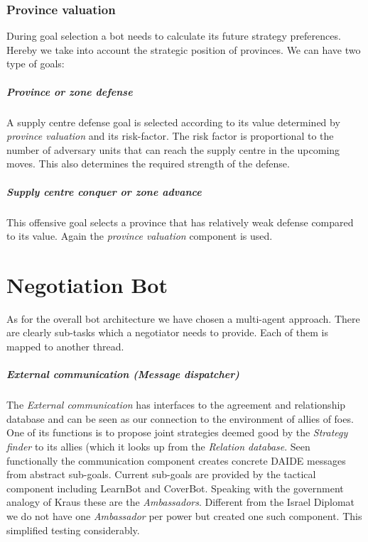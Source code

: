 \documentclass[pdftex,11pt,a4paper]{report}
\begin{document}
\subsection{Province valuation}
During goal selection a bot needs to calculate its future strategy
preferences. Hereby we take into account the strategic position of 
provinces. We can have two type of goals:

\paragraph{Province or zone defense}
A supply centre defense goal is selected according to its value
determined by \textit{province valuation} and its risk-factor. The
risk factor is proportional to the number of adversary units that 
can reach the supply centre in the upcoming moves. This also determines
the required strength of the defense.

\paragraph{Supply centre conquer or zone advance}
This offensive goal selects a province that has relatively weak 
defense compared to its value. Again the \textit{province valuation}
component is used.


\chapter{Negotiation Bot}

As for the overall bot architecture we have chosen a multi-agent 
approach. There are clearly sub-tasks which a negotiator needs to
provide. Each of them is mapped to another thread.

\paragraph{External communication (Message dispatcher)}
The \textit{External communication} has interfaces to the agreement 
and relationship database and can be seen as our connection to the
environment of allies of foes. One of its functions is to propose
joint strategies deemed good by the \textit{Strategy finder} to its
allies (which it looks up from the \textit{Relation database}. Seen
functionally the communication component creates concrete DAIDE
messages from abstract sub-goals. Current sub-goals are provided
by the tactical component including LearnBot and CoverBot. Speaking
with the government analogy of Kraus \cite{Kraus89} these are the
\textit{Ambassadors}. Different from the Israel Diplomat we do not
have one \textit{Ambassador} per power but created one such 
component. This simplified testing considerably. 
\end{document}
